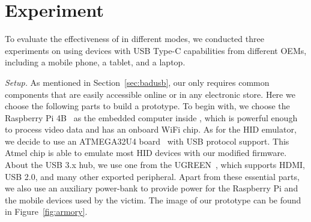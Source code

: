 \section{Experiment}
\label{sec:experiment}

To evaluate the effectiveness of \tool in different modes, we conducted three
experiments on \tool using devices with USB Type-C capabilities from different
OEMs, including a mobile phone, a tablet, and a laptop.

\textit{Setup.}  As mentioned in Section~\ref{sec:badusb},
our \tool only requires common components that are easily accessible online or
in any electronic store. Here we choose the following parts to build a
prototype. To begin with, we choose the Raspberry Pi 4B~\cite{pi4b} as the embedded
computer inside \tool, which is powerful enough to process video data and has
an onboard WiFi chip. As for the HID emulator, we decide to use an ATMEGA32U4 board~\cite{atmel}
with USB protocol support. This Atmel chip is able to emulate most HID devices
with our modified firmware. About the USB 3.x hub, we use one from the
UGREEN~\cite{ugreen}, which supports HDMI, USB 2.0, and many other exported peripheral.
Apart from these essential parts, we also use an auxiliary power-bank to
provide power for the Raspberry Pi and the mobile devices used by the victim.
The image of our prototype \tool can be found in Figure~\ref{fig:armory}.


